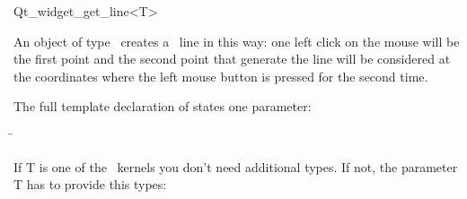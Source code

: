 
\begin{ccRefClass}{Qt_widget_get_line<T>}

\ccDefinition
An object of type \ccRefName\ creates a \cgal\ line in this way: one 
left click on the mouse will be the first point and the second point 
that generate the line will be considered at the coordinates where the left
mouse button is pressed for the second time.


\ccParameters

The full template declaration of  states one parameter:

\begin{tabbing}
 \=\\
\end{tabbing}

If T is one of the \cgal\ kernels you don't need additional types. If
not, the parameter T has to provide this types:

\ccTypes
{}

\ccInheritsFrom
{}

\ccGlue

\ccCreation
{}


\end{ccRefClass}










